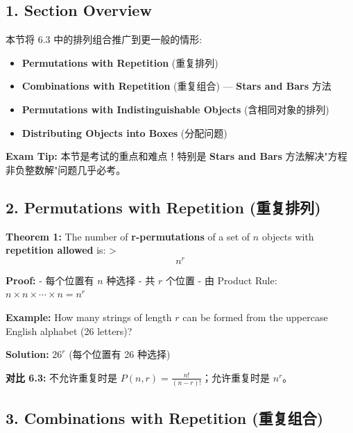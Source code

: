 \documentclass[10pt,a4paper,openany]{ctexbook}
\theoremstyle{definition}
\theoremstyle{remark}
\renewenvironment{quote}
  {\list{}{\leftmargin=1em\rightmargin=0pt\topsep=0.5pt\partopsep=0pt}\item[]}
  {\endlist}
\begin{document}
\vspace{-2pt}

\subsection{1. Section Overview}

本节将 6.3 中的排列组合推广到更一般的情形:
\begin{itemize}
\item \textbf{Permutations with Repetition} (重复排列)
\item \textbf{Combinations with Repetition} (重复组合) — \textbf{Stars and Bars} 方法
\item \textbf{Permutations with Indistinguishable Objects} (含相同对象的排列)
\item \textbf{Distributing Objects into Boxes} (分配问题)

\end{itemize}

\textbf{Exam Tip:} 本节是考试的重点和难点！特别是 \textbf{Stars and Bars} 方法解决"方程非负整数解"问题几乎必考。
\vspace{-2pt}

\subsection{2. Permutations with Repetition (重复排列)}

\begin{quote}
\textbf{Theorem 1:} The number of \textbf{r-permutations} of a set of $n$ objects with \textbf{repetition allowed} is:
>
\[
n^r
\]


\textbf{Proof:}
- 每个位置有 $n$ 种选择
- 共 $r$ 个位置
- 由 Product Rule: $n \times n \times \cdots \times n = n^r$

\textbf{Example:}
How many strings of length $r$ can be formed from the uppercase English alphabet (26 letters)?

\textbf{Solution:} $26^r$ (每个位置有 26 种选择)

\textbf{对比 6.3:} 不允许重复时是 $P(n,r) = \frac{n!}{(n-r)!}$；允许重复时是 $n^r$。

\end{quote}
\vspace{-2pt}

\subsection{3. Combinations with Repetition (重复组合)}
\end{document}
